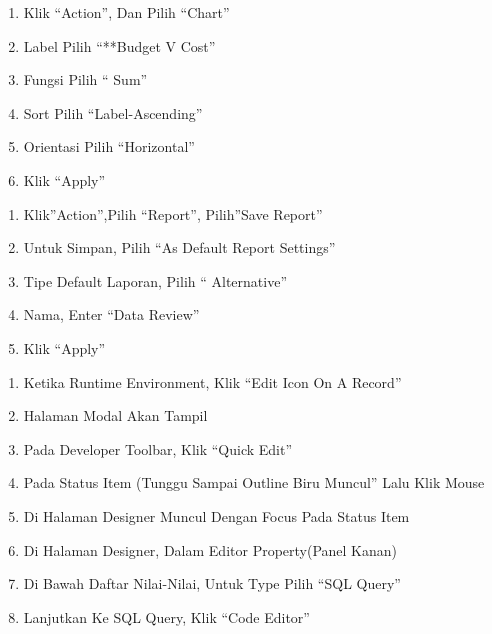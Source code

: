 \documentclass{article}
\begin{document}
\begin{enumerate}
    \item Klik “Action”, Dan Pilih “Chart”
    \item Label Pilih “**Budget V Cost”
    \item Fungsi Pilih “ Sum”
    \item Sort Pilih “Label-Ascending”
    \item Orientasi Pilih “Horizontal”
    \item Klik “Apply”

\end{enumerate}
\begin{enumerate}
\item Klik”Action”,Pilih “Report”, Pilih”Save Report”
\item Untuk Simpan, Pilih “As Default Report Settings”
\item Tipe Default Laporan, Pilih “ Alternative”
\item Nama, Enter “Data Review”
\item Klik “Apply”\\

\end{enumerate}
\begin{enumerate}
    \item Ketika Runtime Environment, Klik “Edit Icon On A Record”
\item Halaman Modal Akan Tampil
\item Pada Developer Toolbar, Klik “Quick Edit”
\item Pada Status Item (Tunggu Sampai Outline Biru Muncul” Lalu Klik Mouse
\item Di Halaman Designer Muncul Dengan Focus Pada Status Item
\item Di Halaman Designer, Dalam Editor Property(Panel Kanan)
\item Di Bawah Daftar Nilai-Nilai, Untuk Type Pilih “SQL Query”
\item Lanjutkan Ke SQL Query, Klik “Code Editor”\\

\end{enumerate}
\end{document}
